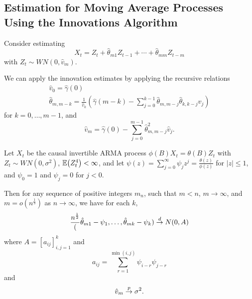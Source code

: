 \subsection{Estimation for Moving Average Processes Using the Innovations Algorithm}
\label{sec:estim-moving-aver}

Consider estimating
\begin{equation}
  \label{eq:52}
  X_{t} = Z_{t} + \hat \theta_{m1} Z_{t-1} + \cdots + \hat \theta_{mm} Z_{t-m}
\end{equation} with $Z_{t} \sim WN(0, \hat v_{m})$.

\begin{thm}
  \label{defn:estimation_arma:5}
  We can apply the innovation estimates by applying the recursive
  relations
  \begin{align}
    \label{eq:53}
    \hat v_{0} = \hat \gamma(0) \\
    \hat \theta_{m, m - k} = \frac{1}{\hat v_{k}}( \hat \gamma(m-k) -
    \sum_{j=0}^{k-1} \hat \theta_{m, m - j} \hat \theta_{k, k - j}
    \hat v_{j})
  \end{align} for $k = 0, \dots, m - 1$, and
  \begin{equation}
    \label{eq:54}
    \hat v_{m} = \hat \gamma(0) - \sum_{j=0}^{m-1} \hat \theta^{2}_{m,
      m - j} \hat v_{j}.
  \end{equation}
\end{thm}

\begin{thm}
  \label{defn:estimation_arma:6}
  Let $X_{t}$ be the causal invertible ARMA process $\phi(B) X_{t} =
  \theta(B) Z_{t}$ with $Z_{t} \sim WN(0, \sigma^{2})$, $\E{Z_{t}^{4}}
  < \infty$, and let $\psi(z) = \sum_{j=0}^{\infty} \psi_{j} z^{j} =
  \frac{\theta(z)}{\phi(z)}$ for $|z| \leq 1$, and $\psi_{0} = 1$ and
  $\psi_{j} = 0$ for $j < 0$.

  Then for any sequence of positive integers $m_{n}$, such that $m <
  n$, $m \rightarrow \infty$, and $m = o(n^{\frac{1}{3}})$ as $n
  \rightarrow \infty$, we have for each $k$,
  \begin{align}
    \label{eq:55}
    \frac{n^{\frac{1}{2}}}(\hat \theta_{m1} - \psi_{1}, \dots, \hat
    \theta_{mk} - \psi_{k}) \overset{d}{\rightarrow} N(0, A)
  \end{align} where $A = [a_{ij}]_{i, j = 1}^{k}$ and
  \begin{equation}
    \label{eq:56}
    a_{ij} = \sum_{r=1}^{\min(i, j)} \psi_{i - r} \psi_{j - r}
  \end{equation} and
  \begin{equation}
    \label{eq:57}
    \hat v_{m} \overset{p}{\rightarrow} \sigma^{2}.
  \end{equation}
\end{thm}

